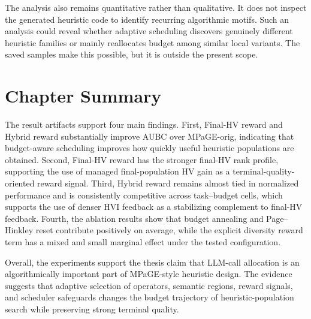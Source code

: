 The analysis also remains quantitative rather than qualitative. It does not inspect the generated heuristic code to identify recurring algorithmic motifs. Such an analysis could reveal whether adaptive scheduling discovers genuinely different heuristic families or mainly reallocates budget among similar local variants. The saved samples make this possible, but it is outside the present scope.

\section*{Chapter Summary}

The result artifacts support four main findings. First, Final-HV reward and Hybrid reward substantially improve AUBC over MPaGE-orig, indicating that budget-aware scheduling improves how quickly useful heuristic populations are obtained. Second, Final-HV reward has the stronger final-HV rank profile, supporting the use of managed final-population HV gain as a terminal-quality-oriented reward signal. Third, Hybrid reward remains almost tied in normalized performance and is consistently competitive across task--budget cells, which supports the use of denser HVI feedback as a stabilizing complement to final-HV feedback. Fourth, the ablation results show that budget annealing and Page--Hinkley reset contribute positively on average, while the explicit diversity reward term has a mixed and small marginal effect under the tested configuration.

Overall, the experiments support the thesis claim that LLM-call allocation is an algorithmically important part of MPaGE-style heuristic design. The evidence suggests that adaptive selection of operators, semantic regions, reward signals, and scheduler safeguards changes the budget trajectory of heuristic-population search while preserving strong terminal quality.
